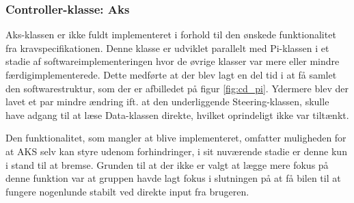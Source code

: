 \subsubsection{Controller-klasse: Aks} \label{sec:aks_impl}

Aks-klassen er ikke fuldt implementeret i forhold til den ønskede funktionalitet fra kravspecifikationen.
Denne klasse er udviklet parallelt med Pi-klassen i et stadie af softwareimplementeringen hvor de øvrige klasser var mere eller mindre færdigimplementerede.
Dette medførte at der blev lagt en del tid i at få samlet den softwarestruktur, som der er afbilledet på figur \ref{fig:cd_pi}.
Ydermere blev der lavet et par mindre ændring ift. at den underliggende Steering-klassen, skulle have adgang til at læse Data-klassen direkte, hvilket oprindeligt ikke var tiltænkt.

Den funktionalitet, som mangler at blive implementeret, omfatter muligheden for at AKS selv kan styre udenom forhindringer, i sit nuværende stadie er denne kun i stand til at bremse.
Grunden til at der ikke er valgt at lægge mere fokus på denne funktion var at gruppen havde lagt fokus i slutningen på at få bilen til at fungere nogenlunde stabilt ved direkte input fra brugeren.